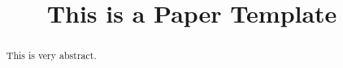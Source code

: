 \documentclass[10pt, conference]{IEEEtran}
\title{This is a Paper Template}
\author{}
\date{}
\begin{document}
\maketitle
\pagestyle{empty}

\begin{abstract}
	This is very abstract.
\end{abstract}







\appendices

\end{document}
